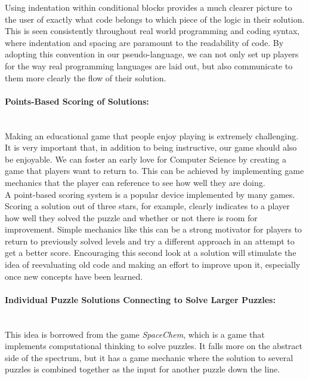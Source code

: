 Using indentation within conditional blocks provides a much clearer picture to the user of exactly what code belongs
to which piece of the logic in their solution. This is seen consistently throughout real world programming and coding
syntax, where indentation and spacing are paramount to the readability of code. By adopting this convention
in our pseudo-language, we can not only set up players for the way real programming languages are laid out, but
also communicate to them more clearly the flow of their solution.\\

\paragraph{Points-Based Scoring of Solutions:} ~\\
Making an educational game that people enjoy playing is extremely challenging. It is very important that, in addition
to being instructive, our game should also be enjoyable. We can foster an early love for Computer Science by
creating a game that players want to return to. This can be achieved by implementing game mechanics that the
player can reference to see how well they are doing.\\

A point-based scoring system is a popular device implemented by many games. Scoring a solution out of three stars,
for example, clearly indicates to a player how well they solved the puzzle and whether or not there is room for
improvement. Simple mechanics like this can be a strong motivator for players to return to previously solved levels
and try a different approach in an attempt to get a better score. Encouraging this second look at a solution will
stimulate the idea of reevaluating old code and making an effort to improve upon it, especially once new concepts
have been learned.\\

\paragraph{Individual Puzzle Solutions Connecting to Solve Larger Puzzles:} ~\\
This idea is borrowed from the game \textit{SpaceChem}, which is a game that implements computational thinking
to solve puzzles. It falls more on the abstract side of the spectrum, but it has a game mechanic where the solution to
several puzzles is combined together as the input for another puzzle down the line.\\

